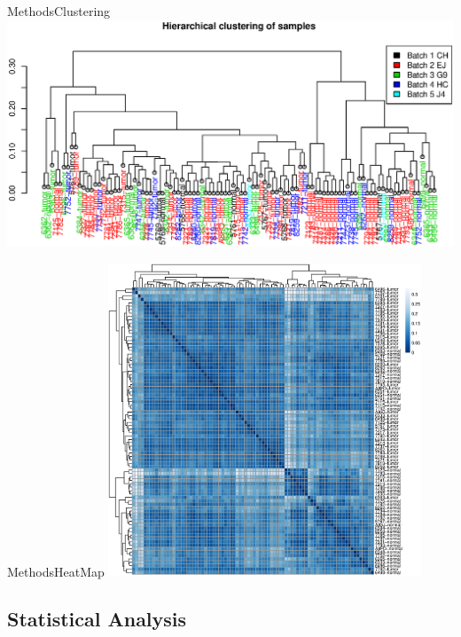 \documentclass{beamer}
\begin{document}
\begin{frame}{Methods}{Clustering}
	\centering
\includegraphics[width=\textwidth,height=0.9\textheight,keepaspectratio]{dendogram-1.eps}

\end{frame}

\begin{frame}{Methods}{HeatMap}
	\centering
	\includegraphics[width=0.70\textwidth,height=0.75\textheight,keepaspectratio]{Clustering.eps}

\end{frame}

\subsection{Statistical Analysis}
\end{document}
